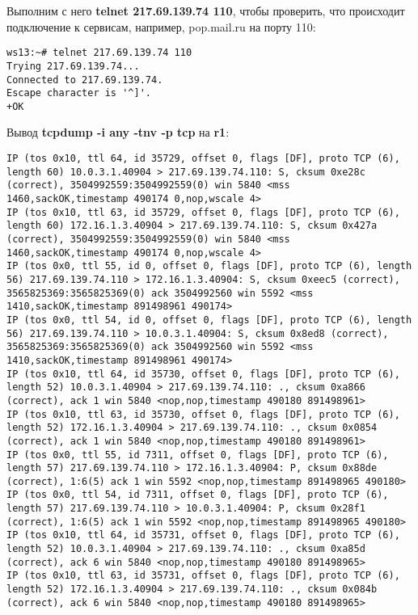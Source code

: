 \documentclass[a4paper,12pt]{article}
\begin{document}
Выполним с него \textbf{telnet 217.69.139.74 110},  чтобы проверить, что
происходит подключение к сервисам, например, pop.mail.ru на порту 110:
\begin{Verbatim}
ws13:~# telnet 217.69.139.74 110
Trying 217.69.139.74...
Connected to 217.69.139.74.
Escape character is '^]'.
+OK
\end{Verbatim}

Вывод \textbf{tcpdump -i any -tnv -p tcp} на \textbf{r1}:
\begin{Verbatim}
IP (tos 0x10, ttl 64, id 35729, offset 0, flags [DF], proto TCP (6), length 60) 10.0.3.1.40904 > 217.69.139.74.110: S, cksum 0xe28c (correct), 3504992559:3504992559(0) win 5840 <mss 1460,sackOK,timestamp 490174 0,nop,wscale 4>
IP (tos 0x10, ttl 63, id 35729, offset 0, flags [DF], proto TCP (6), length 60) 172.16.1.3.40904 > 217.69.139.74.110: S, cksum 0x427a (correct), 3504992559:3504992559(0) win 5840 <mss 1460,sackOK,timestamp 490174 0,nop,wscale 4>
IP (tos 0x0, ttl 55, id 0, offset 0, flags [DF], proto TCP (6), length 56) 217.69.139.74.110 > 172.16.1.3.40904: S, cksum 0xeec5 (correct), 3565825369:3565825369(0) ack 3504992560 win 5592 <mss 1410,sackOK,timestamp 891498961 490174>
IP (tos 0x0, ttl 54, id 0, offset 0, flags [DF], proto TCP (6), length 56) 217.69.139.74.110 > 10.0.3.1.40904: S, cksum 0x8ed8 (correct), 3565825369:3565825369(0) ack 3504992560 win 5592 <mss 1410,sackOK,timestamp 891498961 490174>
IP (tos 0x10, ttl 64, id 35730, offset 0, flags [DF], proto TCP (6), length 52) 10.0.3.1.40904 > 217.69.139.74.110: ., cksum 0xa866 (correct), ack 1 win 5840 <nop,nop,timestamp 490180 891498961>
IP (tos 0x10, ttl 63, id 35730, offset 0, flags [DF], proto TCP (6), length 52) 172.16.1.3.40904 > 217.69.139.74.110: ., cksum 0x0854 (correct), ack 1 win 5840 <nop,nop,timestamp 490180 891498961>
IP (tos 0x0, ttl 55, id 7311, offset 0, flags [DF], proto TCP (6), length 57) 217.69.139.74.110 > 172.16.1.3.40904: P, cksum 0x88de (correct), 1:6(5) ack 1 win 5592 <nop,nop,timestamp 891498965 490180>
IP (tos 0x0, ttl 54, id 7311, offset 0, flags [DF], proto TCP (6), length 57) 217.69.139.74.110 > 10.0.3.1.40904: P, cksum 0x28f1 (correct), 1:6(5) ack 1 win 5592 <nop,nop,timestamp 891498965 490180>
IP (tos 0x10, ttl 64, id 35731, offset 0, flags [DF], proto TCP (6), length 52) 10.0.3.1.40904 > 217.69.139.74.110: ., cksum 0xa85d (correct), ack 6 win 5840 <nop,nop,timestamp 490180 891498965>
IP (tos 0x10, ttl 63, id 35731, offset 0, flags [DF], proto TCP (6), length 52) 172.16.1.3.40904 > 217.69.139.74.110: ., cksum 0x084b (correct), ack 6 win 5840 <nop,nop,timestamp 490180 891498965>

\end{Verbatim}
\end{document}
